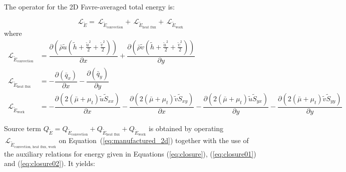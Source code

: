 \documentclass[10pt]{article}
\newcommand{\Diff}[2] {\dfrac{\partial\left( #1\right)}{\partial #2}}
\newcommand{\diff}[2] {\dfrac{\partial #1}{\partial #2}}
\newcommand{\Lo}{\,\mathcal{L}}
\newcommand{\brho}{\bar{\rho}}
\newcommand{\bq}{\bar{q}}
\newcommand{\tu}{\tilde{u}}
\newcommand{\tv}{\tilde{v}}
\newcommand{\tS}{\tilde{S}}
\newcommand{\tE}{\tilde{E}}
\newcommand{\bmu}{\bar{\mu}}
\newcommand{\hh}{\tilde{h}}
\begin{document}
The operator for the 2D  Favre-averaged total energy is:

\begin{equation*}
 \Lo_{\tE}= \Lo_{\tE_\text{convection}} + \Lo_{\tE_\text{heat flux}}+\Lo_{\tE_\text{work}}
\end{equation*}
where
\begin{equation}
\begin{split}\label{eq:E_operators}
\Lo_{\tE_\text{convection}}&= \Diff{\brho \tu \left(\hh+ \frac{\tu^2}{2} +\frac{\tv^2 }{2} \right) }{x}+\Diff{\brho \tv \left(\hh+ \frac{\tu^2}{2} +\frac{\tv^2 }{2}  \right)}{y}\\
\Lo_{\tE_\text{heat flux}}&=- \Diff{\bq_x}{x} -\Diff{\bq_y}{y}\\ %
\Lo_{\tE_\text{work}}&=-\Diff{2(\bmu+\mu_t)\tu \tS_{xx}}{x}-\Diff{2(\bmu+\mu_t)\tv \tS_{xy}}{x}-\Diff{2(\bmu+\mu_t) \tu \tS_{yx}}{y}-\Diff{2(\bmu+\mu_t)\tv \tS_{yy}}{y}
\end{split}
\end{equation}

Source term $Q_{\tE}=Q_{\tE_\text{convection}} + Q_{\tE_\text{heat flux}}+ Q_{\tE_\text{work}}$ is obtained by operating $ \Lo_{\tE_\text{convection, heat flux, work}}$ on Equation~(\ref{eq:manufactured_2d}) together with the use of the  auxiliary relations for energy given in Equations (\ref{eq:closure}), (\ref{eq:closure01}) and (\ref{eq:closure02}). It yields:
\end{document}
